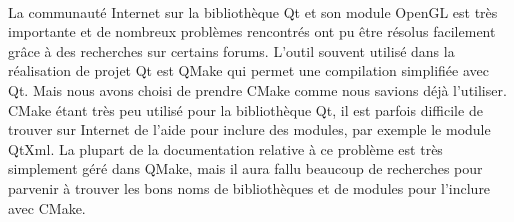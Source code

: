 \paragraph{}
La communauté Internet sur la bibliothèque Qt et son module OpenGL est très importante et de nombreux problèmes rencontrés ont pu être résolus facilement grâce à des recherches sur certains forums. 
L'outil souvent utilisé dans la réalisation de projet Qt est QMake qui permet une compilation simplifiée avec Qt. Mais nous avons choisi de prendre CMake comme nous savions déjà l'utiliser.
CMake étant très peu utilisé pour la bibliothèque Qt, il est parfois difficile de trouver sur Internet de l'aide pour inclure des modules, par exemple le module QtXml. La plupart de la documentation relative à ce problème est très simplement géré dans QMake, mais il aura fallu beaucoup de recherches pour parvenir à trouver les bons noms de bibliothèques et de modules pour l'inclure avec CMake.
